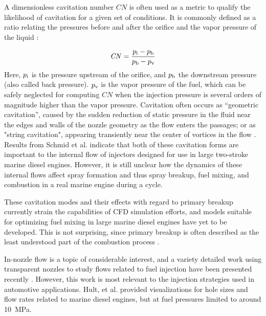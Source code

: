 \documentclass[letterpaper,twocolumn,10pt]{ilass}
\newcommand\CN{\ensuremath{\mathit{CN}}}
\begin{document}
A dimensionless cavitation number $\CN$ is often used as a metric to qualify the likelihood
of cavitation for a given set of conditions. It is commonly defined as a ratio
relating the pressures before and after the orifice and the vapor pressure of the liquid
\cite{Hult2016, Giannadakis2008}:

\begin{equation}
\CN = \frac{p\textsubscript{i} - p\textsubscript{b}}{p\textsubscript{b}-p\textsubscript{v}}
\label{cavitation}
\end{equation}
Here, $p\textsubscript{i}$ is the pressure upstream of the orifice,
and $p\textsubscript{b}$ the downstream pressure (also called back pressure).
$p\textsubscript{v}$ is the vapor pressure of the fuel, which can be safely neglected
for computing $\CN$ when the injection pressure is several orders of magnitude higher
than the vapor pressure.
Cavitation often occurs as ``geometric cavitation'', caused by the sudden reduction of
static pressure in the fluid near the edges and walls of the nozzle geometry as the flow
enters the passages; or as "string cavitation", appearing transiently near the center of
vortices in the flow \cite{Andriotis2008}.
%
Results from Schmid et al. \cite{Schmid2014} indicate that both of these cavitation forms
are important to the internal flow of injectors designed for use in large two-stroke
marine diesel engines.
%
However, it is still unclear how the dynamics of these internal flows affect spray formation
and thus spray breakup, fuel mixing, and combustion in a real marine engine
during a cycle.
%

These cavitation modes and their effects with regard to primary breakup currently
strain the capabilities of CFD simulation efforts, and models suitable for optimizing
fuel mixing in large marine diesel engines have yet to be developed. 
%
This is not surprising, since primary breakup is often described as the least understood part of the combustion process \cite{Fansler2015,Linne2013}.
%

In-nozzle flow is a topic of considerable interest, and a variety detailed work using transparent nozzles to study flows related to fuel injection have been presented recently
\cite{Fansler2015, Blessing2003, Duke2014}.
However, this work is most relevant to the injection strategies used in automotive applications.
Hult, et al. \cite{Hult2016} provided visualizations for hole sizes and flow rates related to marine diesel engines, but at fuel pressures limited to around 10~MPa.
%
\end{document}
